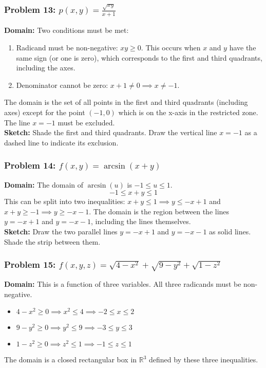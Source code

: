 \documentclass{article}
\begin{document}
\subsubsection{Problem 13: $p(x, y) = \frac{\sqrt{xy}}{x+1}$}
\textbf{Domain:} Two conditions must be met:
\begin{enumerate}
    \item Radicand must be non-negative: $xy \ge 0$. This occurs when $x$ and $y$ have the same sign (or one is zero), which corresponds to the first and third quadrants, including the axes.
    \item Denominator cannot be zero: $x+1 \neq 0 \implies x \neq -1$.
\end{enumerate}
The domain is the set of all points in the first and third quadrants (including axes) except for the point $(-1, 0)$ which is on the x-axis in the restricted zone. The line $x=-1$ must be excluded. \\
\textbf{Sketch:} Shade the first and third quadrants. Draw the vertical line $x=-1$ as a dashed line to indicate its exclusion.

\subsubsection{Problem 14: $f(x, y) = \arcsin(x+y)$}
\textbf{Domain:} The domain of $\arcsin(u)$ is $-1 \le u \le 1$.
\[ -1 \le x+y \le 1 \]
This can be split into two inequalities: $x+y \le 1 \implies y \le -x+1$ and $x+y \ge -1 \implies y \ge -x-1$.
The domain is the region between the lines $y = -x+1$ and $y = -x-1$, including the lines themselves. \\
\textbf{Sketch:} Draw the two parallel lines $y=-x+1$ and $y=-x-1$ as solid lines. Shade the strip between them.

\subsubsection{Problem 15: $f(x, y, z) = \sqrt{4-x^2} + \sqrt{9-y^2} + \sqrt{1-z^2}$}
\textbf{Domain:} This is a function of three variables. All three radicands must be non-negative.
\begin{itemize}
    \item $4-x^2 \ge 0 \implies x^2 \le 4 \implies -2 \le x \le 2$
    \item $9-y^2 \ge 0 \implies y^2 \le 9 \implies -3 \le y \le 3$
    \item $1-z^2 \ge 0 \implies z^2 \le 1 \implies -1 \le z \le 1$
\end{itemize}
The domain is a closed rectangular box in $\mathbb{R}^3$ defined by these three inequalities.
\end{document}
